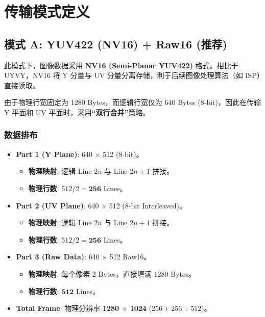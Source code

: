 \documentclass[UTF8]{ctexart}
\begin{document}
\newpage


\section{传输模式定义}

\subsection{模式 A: YUV422 (NV16) + Raw16 (推荐)}

此模式下，图像数据采用 \textbf{NV16 (Semi-Planar YUV422)} 格式。相比于 UYVY，NV16 将 Y 分量与 UV 分量分离存储，利于后续图像处理算法（如 ISP）直接读取。

由于物理行宽固定为 1280 Bytes，而逻辑行宽仅为 640 Bytes (8-bit)，因此在传输 Y 平面和 UV 平面时，采用\textbf{“双行合并”}策略。

\subsubsection{数据排布}

\begin{itemize}
    \item \textbf{Part 1 (Y Plane)}: 640 $\times$ 512 (8-bit)。
        \begin{itemize}
            \item \textbf{物理映射}: 逻辑 Line $2n$ 与 Line $2n+1$ 拼接。
            \item \textbf{物理行数}: $512 / 2 = \mathbf{256}$ Lines。
        \end{itemize}
    \item \textbf{Part 2 (UV Plane)}: 640 $\times$ 512 (8-bit Interleaved)。
        \begin{itemize}
            \item \textbf{物理映射}: 逻辑 Line $2n$ 与 Line $2n+1$ 拼接。
            \item \textbf{物理行数}: $512 / 2 = \mathbf{256}$ Lines。
        \end{itemize}
    \item \textbf{Part 3 (Raw Data)}: 640 $\times$ 512 Raw16。
        \begin{itemize}
            \item \textbf{物理映射}: 每个像素 2 Bytes，直接填满 1280 Bytes。
            \item \textbf{物理行数}: $\mathbf{512}$ Lines。
        \end{itemize}
    \item \textbf{Total Frame}: 物理分辨率 \textbf{1280 $\times$ 1024} ($256+256+512$)。
\end{itemize}
\end{document}
